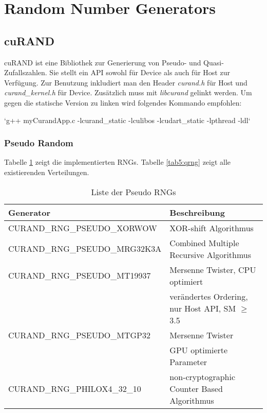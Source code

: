 	\section{Random Number Generators}
		\subsection{cuRAND}
		cuRAND ist eine Bibliothek zur Generierung von Pseudo- und Quasi-Zufallszahlen. Sie stellt ein \Gls{API} sowohl für Device als auch für Host zur Verfügung. Zur Benutzung inkludiert man den Header \textit{curand.h} für Host und \textit{curand{\_}kernel.h} für Device. Zusätzlich muss mit \textit{libcurand} gelinkt werden. Um gegen die statische Version zu linken wird folgendes Kommando empfohlen: 
		
		\li`g++ myCurandApp.c -lcurand_static -lculibos -lcudart_static -lpthread -ldl`
		
            \subsubsection{Pseudo Random}
            Tabelle \ref{tab5:prng} zeigt die implementierten RNGs. Tabelle \ref{tab5:qrng} zeigt alle existierenden Verteilungen.
            \begin{table}[h]
                \centering
                \begin{tabular}{ll}
                    \toprule
                    \textbf{Generator} & \textbf{Beschreibung} \\ \midrule
                    CURAND{\_}RNG{\_}PSEUDO{\_}XORWOW    & XOR-shift Algorithmus \\
                    CURAND{\_}RNG{\_}PSEUDO{\_}MRG32K3A  & Combined Multiple Recursive Algorithmus \\
                    CURAND{\_}RNG{\_}PSEUDO{\_}MT19937   & Mersenne Twister, CPU optimiert \\
                                                         & verändertes Ordering, nur Host API, SM $\geq$ 3.5 \\
                    CURAND{\_}RNG{\_}PSEUDO{\_}MTGP32    & Mersenne Twister \\
                                                         & GPU optimierte Parameter \\
                    CURAND{\_}RNG{\_}PHILOX4{\_}32{\_}10 & non-cryptographic Counter Based Algorithmus \\ \bottomrule
                \end{tabular}
                \caption{Liste der Pseudo RNGs}
            \label{tab5:prng}
            \end{table}
			
